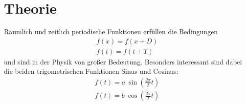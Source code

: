 

\section{Theorie}
Räumlich und zeitlich periodische Funktionen erfüllen die Bedingungen
\begin{align*}
f(x)=f(x+D)\\
f(t)=f(t+T)
\end{align*}
und sind in der Physik von großer Bedeutung. Besonders interessant sind dabei die beiden trigometrischen Funktionen Sinus und Cosinus:
\begin{align*}
f(t)=a~ \sin \left(\frac{2\pi}{T}t\right)\\
f(t)=b~ \cos \left(\frac{2\pi}{T}t\right)
\end{align*}

